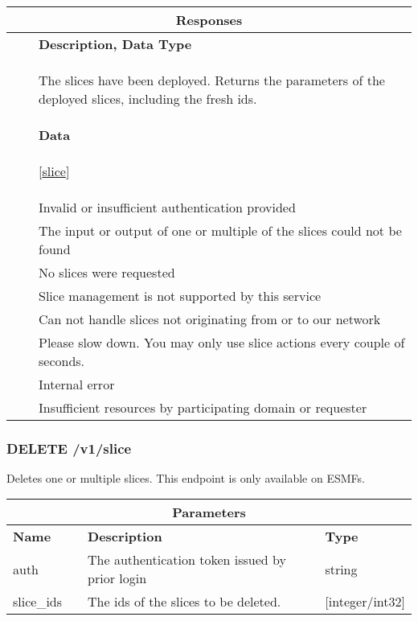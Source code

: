 \begin{longtable}{ |p{1.0cm}|p{3cm}|p{6.44cm}| }
\hline
\multicolumn{3}{|c|}{\textbf{Responses}} \\
 \hline
\centering{\textbf{Code}} & \centering{\textbf{Content Type}} & \textbf{Description, Data Type} \\
\hline
\centering{200} & \centering{application/json} & The slices have been deployed. Returns the parameters of the deployed slices, including the fresh ids.

\paragraph{Data} [\hyperref[esmf_slice]{slice}] \\
 \hline
\endhead
\centering{403} & \centering{text/plain} & Invalid or insufficient authentication provided \\
 \hline
\centering{404} & \centering{text/plain} & The input or output of one or multiple of the slices could not be found \\
 \hline
\centering{417} & \centering{text/plain} & No slices were requested \\
 \hline
\centering{421} & \centering{text/plain} & Slice management is not supported by this service \\
 \hline
\centering{422} & \centering{text/plain} & Can not handle slices not originating from or to our network \\
 \hline
\centering{429} & \centering{text/plain} & Please slow down. You may only use slice actions every couple of seconds. \\
 \hline
\centering{500} & \centering{text/plain} & Internal error \\
 \hline
\centering{507} & \centering{text/plain} & Insufficient resources by participating domain or requester \\
 \hline
\end{longtable}

\newpage
\subsubsection{DELETE /v1/slice}
Deletes one or multiple slices. This endpoint is only available on ESMFs.
\begin{longtable}{ |p{2.5cm}|p{1.5cm}|p{4cm}|p{2cm}| }
\hline
\multicolumn{4}{|c|}{\textbf{Parameters}} \\
 \hline
\textbf{Name} & \centering{\textbf{Location}} & \textbf{Description} & \textbf{Type} \\
\hline
auth & \centering{QUERY} & The authentication token issued by prior login & string \\
 \hline
slice\_ids & \centering{QUERY} & The ids of the slices to be deleted. & [integer/int32] \\
 \hline
\endhead \end{longtable}

